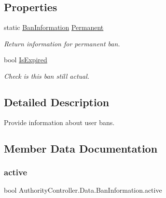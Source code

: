 \subsection*{Properties}
\begin{DoxyCompactItemize}
\item 
static \mbox{\hyperlink{struct_authority_controller_1_1_data_1_1_ban_information}{Ban\+Information}} \mbox{\hyperlink{struct_authority_controller_1_1_data_1_1_ban_information_aee645f20f1abb308cd54a640f94cbdf5}{Permanent}}
\begin{DoxyCompactList}\small\item\em Return information for permanent ban. \end{DoxyCompactList}\item 
bool \mbox{\hyperlink{struct_authority_controller_1_1_data_1_1_ban_information_a4f5feca536c5a0004d14b0f620e5b373}{Is\+Expired}}
\begin{DoxyCompactList}\small\item\em Check is this ban still actual. \end{DoxyCompactList}\end{DoxyCompactItemize}


\subsection{Detailed Description}
Provide information about user bans. 



\subsection{Member Data Documentation}
\mbox{\label{struct_authority_controller_1_1_data_1_1_ban_information_afd9b25205b762ab78e319e6c5568a370}} 
\subsubsection{\texorpdfstring{active}{active}}
{\footnotesize\ttfamily bool Authority\+Controller.\+Data.\+Ban\+Information.\+active}



